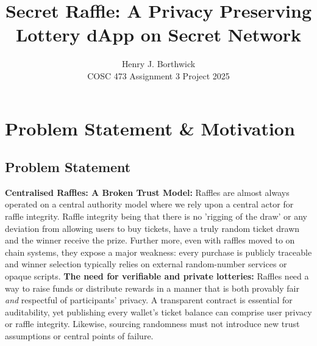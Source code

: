 \documentclass{article}
\title{Secret Raffle: A Privacy Preserving Lottery dApp on Secret Network}
\author{Henry J. Borthwick \\ COSC 473 Assignment 3 Project 2025}
\begin{document}
\maketitle

\begin{abstract}
  
\end{abstract}

\section{Problem Statement \& Motivation}
\subsection{Problem Statement}
\textbf{Centralised Raffles: A Broken Trust Model:} Raffles are almost always operated on a central authority model where we rely upon a central actor for raffle integrity. Raffle integrity being that there is no 'rigging of the draw' or any deviation from allowing users to buy tickets, have a truly random ticket drawn and the winner receive the prize. Further more, even with raffles moved to on chain systems, they expose a major weakness: every purchase is publicly traceable and winner selection typically relies on external random-number services or opaque scripts. \textbf{The need for verifiable and private lotteries:} Raffles need a way to raise funds or distribute rewards in a manner that is both provably fair \emph{and} respectful of participants' privacy. A transparent contract is essential for auditability, yet publishing every wallet's ticket balance can comprise user privacy or raffle integrity. Likewise, sourcing randomness must not introduce new trust assumptions or central points of failure.
\end{document}
